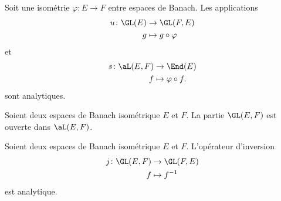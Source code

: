 \begin{proposition}	\label{PROPooNRXBooTdEKsu}
	Soit une isométrie \(\varphi \colon E\to F  \) entre espaces de Banach. Les applications
	\begin{equation}
		\begin{aligned}
			u\colon \GL(E) & \to \GL(F,E)          \\
			g              & \mapsto g\circ\varphi
		\end{aligned}
	\end{equation}
	et
	\begin{equation}
		\begin{aligned}
			s\colon  \aL(E,F) & \to \End(E)             \\
			f                 & \mapsto \varphi\circ f.
		\end{aligned}
	\end{equation}
	sont analytiques.
\end{proposition}


\begin{proposition}	\label{PROPooHJETooZHzodH}
	Soient deux espaces de Banach isométrique \( E\) et \( F\). La partie \( \GL(E,F)\) est ouverte dans \( \aL(E,F)\).
\end{proposition}

\begin{proposition}	\label{PROPooYJWGooEbbLVw}
	Soient deux espaces de Banach isométrique \( E\) et \( F\). L'opérateur d'inversion
	\begin{equation}
		\begin{aligned}
			j\colon \GL(E,F) & \to \GL(F,E)   \\
			f                & \mapsto f^{-1}
		\end{aligned}
	\end{equation}
	est analytique.
\end{proposition}

